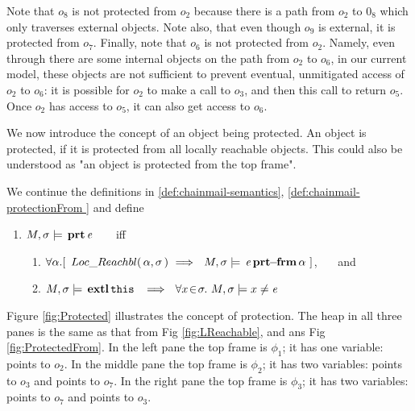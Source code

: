  

Note that $o_8$ is not protected from $o_2$ because there is a path from $o_2$ to $0_8$ which only traverses external objects. Note also, that even though $o_9$ is external, it is protected from $o_7$.
Finally, note that $o_6$ is not protected from $o_2$. 
Namely, even through there are some internal objects on the path from $o_2$ to $o_6$, in our current model, these objects are not sufficient to prevent eventual, unmitigated access of $o_2$ to $o_6$: it is possible for $o_2$ to make a call to $o_3$, and then this call to return $o_5$. Once $o_2$ has access to $o_5$, it can also get access to $o_6$. 


\vspace{.1in}

We now introduce the concept of an object being protected.
An object is protected, if it is protected from all locally reachable objects. This could also be understood as 
"an object is protected from the top frame". 
 
\begin{definition} 
\label{def:chainmail-protection}
\label{sect:semantics:assert:prt}
We continue the definitions in \ref{def:chainmail-semantics}, \ref{def:chainmail-protectionFrom } and  define   
\begin{enumerate}
\item
$M , \sigma \models {\ensuremath{\, \mathbf{prt}}\, \mathit{e}\, }$  \ \ \ iff \ \ \ 
\begin{enumerate}
\item
{$\forall \alpha.[ \  \LRelevant {\alpha}  {\sigma}\ \Longrightarrow \ \  \satisfiesA{M}{\sigma}{\protectedFrom{\re} {{\alpha}}}\ ] $}, \ \ \ and 
\item
$\satisfiesA{M}{\sigma}{\external{\prg{this}}}\ \ \Longrightarrow\ \ \forall x\!\in\! \sigma.\ \satisfiesA{M}{\sigma}{x\neq \re}$
\end{enumerate}
\end{enumerate}
\end{definition} 
 
  Figure \ref{fig:Protected} illustrates the concept of protection. The heap in all three panes is the same as that from  Fig \ref{fig:LReachable}, and 
 ans Fig \ref{fig:ProtectedFrom}. In the left pane the top frame is $\phi_1$; it has  one variable:  points to $o_2$. In the middle pane the top frame is $\phi_2$; it has two  variables:   \prg{this} points to $o_3$ and  points to $o_7$. In the right pane  the top frame is $\phi_3$; it has two  variables:    points to $o_7$ and  points to $o_3$.  

